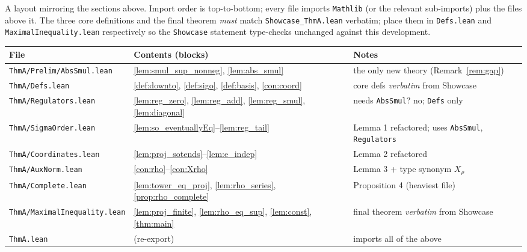 \documentclass[11pt]{article}
\theoremstyle{definition}
\theoremstyle{plain}
\theoremstyle{remark}
\newcommand{\Xrho}{X_{\rho}}
\begin{document}
A layout mirroring the sections above. Import order is top-to-bottom; every file
imports \texttt{Mathlib} (or the relevant sub-imports) plus the files above it.
The three core definitions and the final theorem \emph{must} match
\texttt{Showcase\_ThmA.lean} verbatim; place them in \texttt{Defs.lean} and
\texttt{MaximalInequality.lean} respectively so the \texttt{Showcase} statement
type-checks unchanged against this development.

\begin{center}
\small
\begin{tabular}{lll}
\toprule
File & Contents (blocks) & Notes \\
\midrule
\texttt{ThmA/Prelim/AbsSmul.lean}
  & \ref{lem:smul_sup_nonneg}, \ref{lem:abs_smul}
  & the only new theory (Remark~\ref{rem:gap}) \\
\texttt{ThmA/Defs.lean}
  & \ref{def:downto}, \ref{def:sigo}, \ref{def:basis}, \ref{con:coord}
  & core defs \emph{verbatim} from Showcase \\
\texttt{ThmA/Regulators.lean}
  & \ref{lem:reg_zero}, \ref{lem:reg_add}, \ref{lem:reg_smul}, \ref{lem:diagonal}
  & needs \texttt{AbsSmul}? no; \texttt{Defs} only \\
\texttt{ThmA/SigmaOrder.lean}
  & \ref{lem:so_eventuallyEq}--\ref{lem:reg_tail}
  & Lemma 1 refactored; uses \texttt{AbsSmul}, \texttt{Regulators} \\
\texttt{ThmA/Coordinates.lean}
  & \ref{lem:proj_sotends}--\ref{lem:e_indep}
  & Lemma 2 refactored \\
\texttt{ThmA/AuxNorm.lean}
  & \ref{con:rho}--\ref{con:Xrho}
  & Lemma 3 + type synonym \(\Xrho\) \\
\texttt{ThmA/Complete.lean}
  & \ref{lem:tower_eq_proj}, \ref{lem:rho_series}, \ref{prop:rho_complete}
  & Proposition 4 (heaviest file) \\
\texttt{ThmA/MaximalInequality.lean}
  & \ref{lem:proj_finite}, \ref{lem:rho_eq_sup}, \ref{lem:const}, \ref{thm:main}
  & final theorem \emph{verbatim} from Showcase \\
\texttt{ThmA.lean}
  & (re-export) & imports all of the above \\
\bottomrule
\end{tabular}
\end{center}
\end{document}
